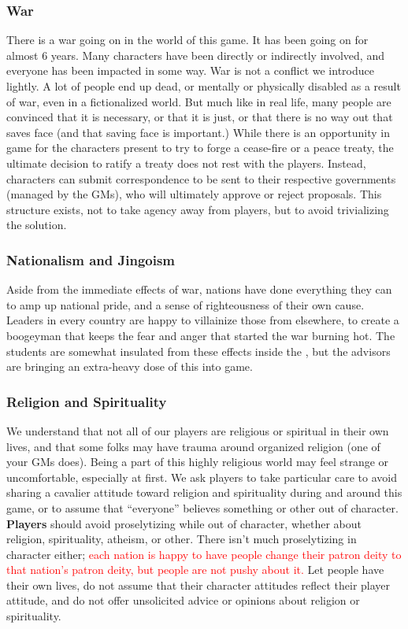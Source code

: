 \documentclass[sheet]{GL2020}
\begin{document}
\subsubsection{War}
There is a war going on in the world of this game. It has been going on for almost 6 years. Many characters have been directly or indirectly involved, and everyone has been impacted in some way. War is not a conflict we introduce lightly. A lot of people end up dead, or mentally or physically disabled as a result of war, even in a fictionalized world. But much like in real life, many people are convinced that it is necessary, or that it is just, or that there is no way out that saves face (and that saving face is important.) While there is an opportunity in game for the characters present to try to forge a cease-fire or a peace treaty, the ultimate decision to ratify a treaty does not rest with the players. Instead, characters can submit correspondence to be sent to their respective governments (managed by the GMs), who will ultimately approve or reject proposals. This structure exists, not to take agency away from players, but to avoid trivializing the solution. 

\subsubsection{Nationalism and Jingoism}
Aside from the immediate effects of war, nations have done everything they can to amp up national pride, and a sense of righteousness of their own cause. Leaders in every country are happy to villainize those from elsewhere, to create a boogeyman that keeps the fear and anger that started the war burning hot. The students are somewhat insulated from these effects inside the \pSchool{}, but the advisors are bringing an extra-heavy dose of this into game.

\subsubsection{Religion and Spirituality}
We understand that not all of our players are religious or spiritual in their own lives, and that some folks may have trauma around organized religion (one of your GMs does). Being a part of this highly religious world may feel strange or uncomfortable, especially at first. We ask players to take particular care to avoid sharing a cavalier attitude toward religion and spirituality during and around this game, or to assume that ``everyone'' believes something or other out of character. \textbf{Players} should avoid proselytizing while out of character, whether about religion, spirituality, atheism, or other. There isn't much proselytizing in character either; \textcolor{red}{each nation is happy to have people change their patron deity to that nation's patron deity, but people are not pushy about it.} Let people have their own lives, do not assume that their character attitudes reflect their player attitude, and do not offer unsolicited advice or opinions about religion or spirituality.
\end{document}
